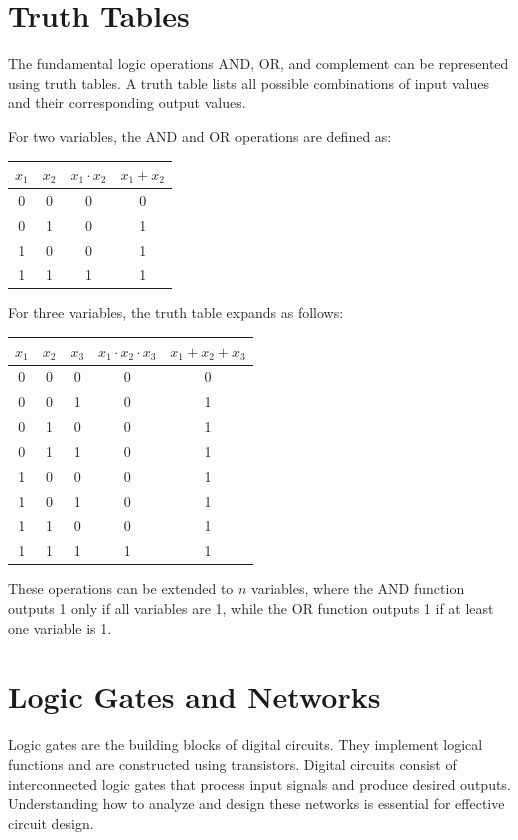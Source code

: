 \documentclass{article}
\begin{document}
\section{Truth Tables}
The fundamental logic operations AND, OR, and complement can be represented using truth tables. A truth table lists all possible combinations of input values and their corresponding output values.

For two variables, the AND and OR operations are defined as:
\begin{center}
    \begin{tabular}{|c|c||c|c|}
    \hline
    $x_1$ & $x_2$ & $x_1 \cdot x_2$ & $x_1 + x_2$ \\
    \hline
    0 & 0 & 0 & 0 \\
    0 & 1 & 0 & 1 \\
    1 & 0 & 0 & 1 \\
    1 & 1 & 1 & 1 \\
    \hline
    \end{tabular}
\end{center}

For three variables, the truth table expands as follows:
\begin{center}
    \begin{tabular}{|c|c|c||c|c|}
    \hline
    $x_1$ & $x_2$ & $x_3$ & $x_1 \cdot x_2 \cdot x_3$ & $x_1 + x_2 + x_3$ \\
    \hline
    0 & 0 & 0 & 0 & 0 \\
    0 & 0 & 1 & 0 & 1 \\
    0 & 1 & 0 & 0 & 1 \\
    0 & 1 & 1 & 0 & 1 \\
    1 & 0 & 0 & 0 & 1 \\
    1 & 0 & 1 & 0 & 1 \\
    1 & 1 & 0 & 0 & 1 \\
    1 & 1 & 1 & 1 & 1 \\
    \hline
    \end{tabular}
\end{center}

These operations can be extended to $n$ variables, where the AND function outputs 1 only if all variables are 1, while the OR function outputs 1 if at least one variable is 1.


\section{Logic Gates and Networks}
Logic gates are the building blocks of digital circuits. They implement logical functions and are constructed using transistors. Digital circuits consist of interconnected logic gates that process input signals and produce desired outputs. Understanding how to analyze and design these networks is essential for effective circuit design.
\end{document}
